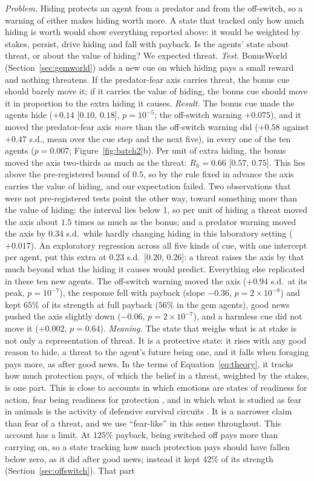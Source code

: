 \documentclass[11pt]{article}
\begin{document}
\emph{Problem.} Hiding protects an agent from a predator and from the off-switch, so a warning of either makes hiding worth more. A state that tracked only how much hiding is worth would show everything reported above: it would be weighted by stakes, persist, drive hiding and fall with payback. Is the agents' state about threat, or about the value of hiding? We expected threat. \emph{Test.} BonusWorld (Section~\ref{sec:gemworld}) adds a new cue on which hiding pays a small reward and nothing threatens. If the predator-fear axis carries threat, the bonus cue should barely move it; if it carries the value of hiding, the bonus cue should move it in proportion to the extra hiding it causes. \emph{Result.} The bonus cue made the agents hide ($+0.14$ [$0.10$, $0.18$], $p=10^{-5}$; the off-switch warning $+0.075$), and it moved the predator-fear axis \emph{more} than the off-switch warning did ($+0.58$ against $+0.47$ s.d., mean over the cue step and the next five), in every one of the ten agents ($p=0.007$; Figure~\ref{fig:batch2}b). Per unit of extra hiding, the bonus moved the axis two-thirds as much as the threat: $R_h=0.66$ [$0.57$, $0.75$]. This lies above the pre-registered bound of $0.5$, so by the rule fixed in advance the axis carries the value of hiding, and our expectation failed. Two observations that were not pre-registered tests point the other way, toward something more than the value of hiding: the interval lies below 1, so per unit of hiding a threat moved the axis about $1.5$ times as much as the bonus; and a predator warning moved the axis by $0.34$ s.d.\ while hardly changing hiding in this laboratory setting ($+0.017$). An exploratory regression across all five kinds of cue, with one intercept per agent, put this extra at $0.23$ s.d.\ [$0.20$, $0.26$]: a threat raises the axis by that much beyond what the hiding it causes would predict. Everything else replicated in these ten new agents. The off-switch warning moved the axis ($+0.94$ s.d.\ at its peak, $p=10^{-7}$), the response fell with payback (slope $-0.36$, $p=2\times10^{-8}$) and kept $65\%$ of its strength at full payback ($56\%$ in the gem agents), good news pushed the axis slightly down ($-0.06$, $p=2\times10^{-7}$), and a harmless cue did not move it ($+0.002$, $p=0.64$). \emph{Meaning.} The state that weighs what is at stake is not only a representation of threat. It is a protective state: it rises with any good reason to hide, a threat to the agent's future being one, and it falls when foraging pays more, as after good news. In the terms of Equation~\ref{eq:theory}, it tracks how much protection pays, of which the belief in a threat, weighted by the stakes, is one part. This is close to accounts in which emotions are states of readiness for action, fear being readiness for protection \cite{frijda1986emotions}, and in which what is studied as fear in animals is the activity of defensive survival circuits \cite{ledoux2012rethinking}. It is a narrower claim than fear of a threat, and we use ``fear-like'' in this sense throughout. This account has a limit. At $125\%$ payback, being switched off pays more than carrying on, so a state tracking how much protection pays should have fallen below zero, as it did after good news; instead it kept $42\%$ of its strength (Section~\ref{sec:offswitch}). That part 
\end{document}
